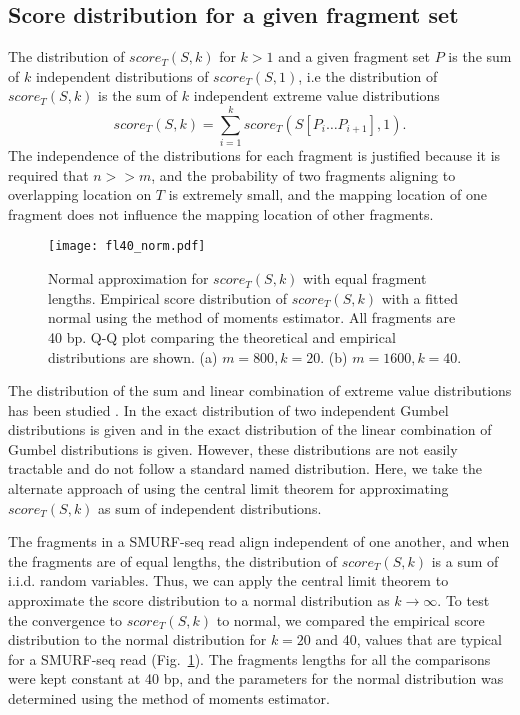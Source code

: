 \subsection{Score distribution for a given fragment set}
The distribution of $score_T(S,k)$ for $k > 1$ and a given fragment set
$P$ is the sum of $k$ independent distributions of $score_T(S,1)$, i.e
the distribution of $score_T(S,k)$ is the sum of $k$ independent extreme
value distributions \[score_T(S,k) = \sum_{i=1}^{k} score_T(S[P_i \dots
P_{i+1}], 1).\]
The independence of the distributions for each fragment is justified
because it is required that $n >> m$, and the probability of two
fragments aligning to overlapping location on $T$ is extremely small,
and the mapping location of one fragment does not influence the mapping
location of other fragments.

\begin{figure}[t!]
\centering
\texttt{[image: fl40\_norm.pdf]}
\caption[Normal approximation for $score_T(S,k)$ with equal fragment
  lengths]{
  Normal approximation for $score_T(S,k)$ with equal fragment lengths.
  Empirical score distribution of $score_T(S,k)$ with a fitted
  normal using the method of moments estimator. All fragments are 40 bp.
  Q-Q plot comparing the theoretical and empirical distributions are shown.
  (a) $m=800, k=20$.
  (b) $m=1600, k=40$.}
\label{norm_const}
\end{figure}

The distribution of the sum and linear combination of extreme value
distributions has been studied \citep{cetinkaya2001scalable,
marques2015distribution,loaiciga1999analysis,nadarajah2008exact}.  In
\cite{loaiciga1999analysis} the exact distribution of two independent
Gumbel distributions is given and in \cite{nadarajah2008exact} the exact
distribution of the linear combination of Gumbel distributions is given.
%
However, these distributions are not easily tractable and do not follow
a standard named distribution. Here, we take the alternate approach of
using the central limit theorem for approximating $score_T(S,k)$ as sum
of independent distributions.

The fragments in a SMURF-seq read align independent of one another, and
when the fragments are of equal lengths, the distribution of
$score_T(S,k)$ is a sum of i.i.d. random variables. Thus, we can apply
the central limit theorem to approximate the score distribution to a
normal distribution as $k \to \infty$. To test the convergence to
$score_T(S,k)$ to normal, we compared the empirical score distribution
to the normal distribution for $k = 20$ and 40, values that are typical
for a SMURF-seq read (Fig.~\ref{norm_const}). The fragments lengths for
all the comparisons were kept constant at 40 bp, and the parameters for
the normal distribution was determined using the method of moments
estimator.

